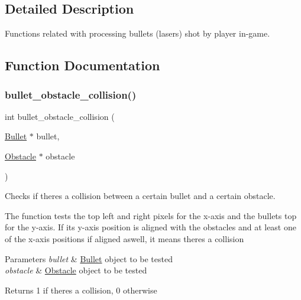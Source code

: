 \subsection{Detailed Description}
Functions related with processing bullets (lasers) shot by player in-\/game. 



\subsection{Function Documentation}
\hypertarget{group__bullet_ga821005fc4046140ee784eafbe32db07a}{}\label{group__bullet_ga821005fc4046140ee784eafbe32db07a} 
\subsubsection{\texorpdfstring{bullet\+\_\+obstacle\+\_\+collision()}{bullet\_obstacle\_collision()}}
{\footnotesize\ttfamily int bullet\+\_\+obstacle\+\_\+collision (\begin{DoxyParamCaption}\item[{\hyperlink{struct_bullet}{Bullet} $\ast$}]{bullet,  }\item[{\hyperlink{struct_obstacle}{Obstacle} $\ast$}]{obstacle }\end{DoxyParamCaption})}



Checks if there\textquotesingle{}s a collision between a certain bullet and a certain obstacle. 

The function tests the top left and right pixels for the x-\/axis and the bullet\textquotesingle{}s top for the y-\/axis. If its y-\/axis position is aligned with the obstacle\textquotesingle{}s and at least one of the x-\/axis positions if aligned aswell, it means there\textquotesingle{}s a collision


\begin{DoxyParams}{Parameters}
{\em bullet} & \hyperlink{struct_bullet}{Bullet} \textquotesingle{}object\textquotesingle{} to be tested \\
\hline
{\em obstacle} & \hyperlink{struct_obstacle}{Obstacle} \textquotesingle{}object\textquotesingle{} to be tested \\
\hline
\end{DoxyParams}
\begin{DoxyReturn}{Returns}
1 if there\textquotesingle{}s a collision, 0 otherwise 
\end{DoxyReturn}
\hypertarget{group__bullet_gaf45d82f5138b8d8b424513cda1236282}{}\label{group__bullet_gaf45d82f5138b8d8b424513cda1236282} 
